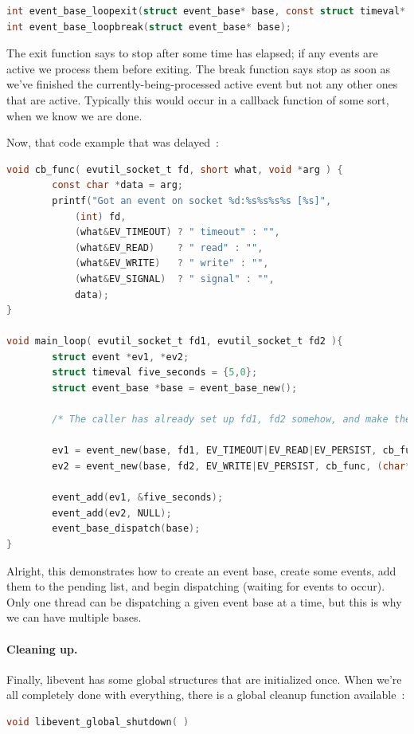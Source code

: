 \documentclass[a4paper]{report}
\begin{document}
\begin{lstlisting}[language=C]
int event_base_loopexit(struct event_base* base, const struct timeval* tv);
int event_base_loopbreak(struct event_base* base);
\end{lstlisting}

The exit function says to stop after some time has elapsed; if any events are active we process them before exiting. The break function says stop as soon as we've finished the currently-being-processed active event but not any other ones that are active. Typically this would occur in a callback function of some sort, when we know we are done.

Now, that code example that was delayed~\cite{libevent}:
\begin{lstlisting}[language=C]
void cb_func( evutil_socket_t fd, short what, void *arg ) {
        const char *data = arg;
        printf("Got an event on socket %d:%s%s%s%s [%s]",
            (int) fd,
            (what&EV_TIMEOUT) ? " timeout" : "",
            (what&EV_READ)    ? " read" : "",
            (what&EV_WRITE)   ? " write" : "",
            (what&EV_SIGNAL)  ? " signal" : "",
            data);
}

void main_loop( evutil_socket_t fd1, evutil_socket_t fd2 ){
        struct event *ev1, *ev2;
        struct timeval five_seconds = {5,0};
        struct event_base *base = event_base_new();

        /* The caller has already set up fd1, fd2 somehow, and make them nonblocking. */

        ev1 = event_new(base, fd1, EV_TIMEOUT|EV_READ|EV_PERSIST, cb_func,(char*)"Reading event");
        ev2 = event_new(base, fd2, EV_WRITE|EV_PERSIST, cb_func, (char*)"Writing event");

        event_add(ev1, &five_seconds);
        event_add(ev2, NULL);
        event_base_dispatch(base);
}
\end{lstlisting}

Alright, this demonstrates how to create an event base, create some events, add them to the pending list, and begin dispatching (waiting for events to occur). Only one thread can be dispatching a given event base at a time, but this is why we can have multiple bases.

\paragraph{Cleaning up.} Finally, libevent has some global structures that are initialized once. When we're all completely done with everything, there is a global cleanup function available~\cite{libevent}:
\begin{lstlisting}[language=C]
void libevent_global_shutdown( )
\end{lstlisting}
\end{document}
